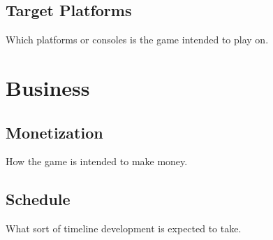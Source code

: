 \subsection{Target Platforms}
Which platforms or consoles is the game intended to play on.

\section{Business}
\subsection{Monetization}
How the game is intended to make money.
\subsection{Schedule}
What sort of timeline development is expected to take.

